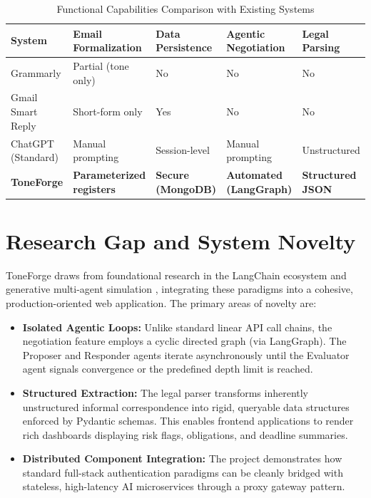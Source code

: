 \documentclass[12pt,a4paper]{report}
\begin{document}
\begin{table}[ht]
	\centering
	\renewcommand{\arraystretch}{1.6}
	\setlength{\tabcolsep}{8pt}
	\begin{tabularx}{\textwidth}{>{\raggedright}p{2.8cm} >{\raggedright}p{2.8cm} >{\raggedright}p{2.4cm} >{\raggedright}p{2.6cm} >{\raggedright\arraybackslash}X}
		\toprule
		\textbf{System}    & \textbf{Email Formalization}     & \textbf{Data Persistence} & \textbf{Agentic Negotiation}   & \textbf{Legal Parsing}   \\
		\midrule
		Grammarly          & Partial (tone only)              & No                        & No                             & No                       \\
		Gmail Smart Reply  & Short-form only                  & Yes                       & No                             & No                       \\
		ChatGPT (Standard) & Manual prompting                 & Session-level             & Manual prompting               & Unstructured             \\
		\textbf{ToneForge} & \textbf{Parameterized registers} & \textbf{Secure (MongoDB)} & \textbf{Automated (LangGraph)} & \textbf{Structured JSON} \\
		\bottomrule
	\end{tabularx}
	\caption{Functional Capabilities Comparison with Existing Systems}
\end{table}

\section{Research Gap and System Novelty}
ToneForge draws from foundational research in the LangChain ecosystem \cite{chase} and generative multi-agent simulation \cite{park}, integrating these paradigms into a cohesive, production-oriented web application. The primary areas of novelty are:

\begin{itemize}
	\item \textbf{Isolated Agentic Loops:} Unlike standard linear API call chains, the negotiation feature employs a cyclic directed graph (via LangGraph). The Proposer and Responder agents iterate asynchronously until the Evaluator agent signals convergence or the predefined depth limit is reached.
	\item \textbf{Structured Extraction:} The legal parser transforms inherently unstructured informal correspondence into rigid, queryable data structures enforced by Pydantic schemas. This enables frontend applications to render rich dashboards displaying risk flags, obligations, and deadline summaries.
	\item \textbf{Distributed Component Integration:} The project demonstrates how standard full-stack authentication paradigms can be cleanly bridged with stateless, high-latency AI microservices through a proxy gateway pattern.
\end{itemize}
\end{document}
